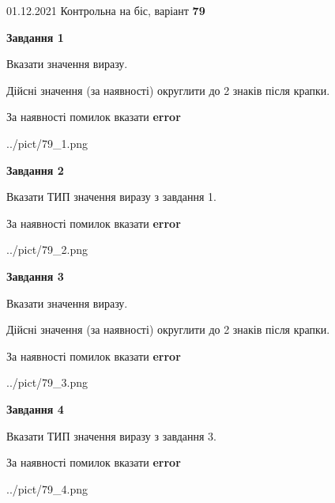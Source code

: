 \documentclass[11pt, ukrainian]{article}
\begin{document}
{01.12.2021 Контрольна на біс, варіант  \No \textbf { 79 }\par}
{
\begin {large}
{\begin {center}\textbf{Завдання 1}\end {center}}\par
Вказати значення виразу. \par
Дійсні значення (за наявності) округлити до 2 знаків після крапки. \par
За наявності помилок вказати \textbf{error}

\begin{center}
	{../pict/79_1.png}
\end{center}
\newpage

{\begin {center}\textbf{Завдання 2}\end {center}}\par
Вказати ТИП значення виразу з завдання 1. \par
За наявності помилок вказати \textbf{error}

\begin{center}
	{../pict/79_2.png}
\end{center}
\newpage

{\begin {center}\textbf{Завдання 3}\end {center}}\par
Вказати значення виразу. \par
Дійсні значення (за наявності) округлити до 2 знаків після крапки. \par
За наявності помилок вказати \textbf{error}

\begin{center}
	{../pict/79_3.png}
\end{center}
\newpage

{\begin {center}\textbf{Завдання 4}\end {center}}\par
Вказати ТИП значення виразу з завдання 3. \par
За наявності помилок вказати \textbf{error}

\begin{center}
	{../pict/79_4.png}
\end{center}
\newpage


\end{large}}
\end{document}
